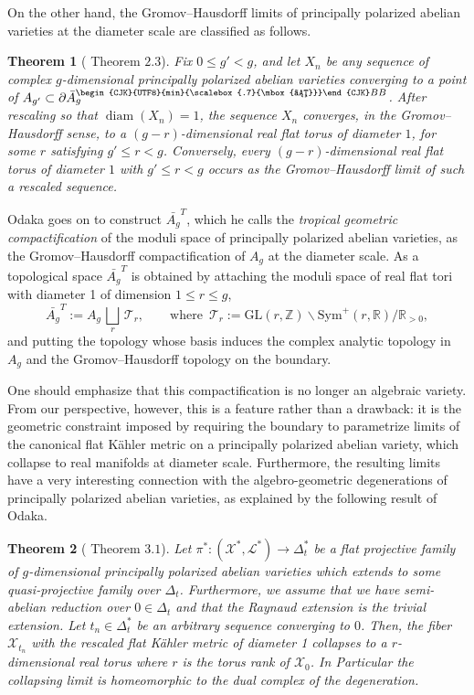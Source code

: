 \documentclass[11pt]{amsart}
\theoremstyle{plain}
\newtheorem{theorem}{Theorem}[section]
\theoremstyle{definition}
\theoremstyle{remark}
\newcommand{\X}{{\mathcal X }}
\newcommand{\R}{\mathbb R}
\newcommand{\Z}{\mathbb{Z}}
\newcommand{\sym}{\mathrm{Sym}^{\!+}}
\newcommand{\sbb}{\text{\begin{CJK}{UTF8}{min}{\scalebox{.7}{\mbox{さ}}}\end{CJK}}BB}
\begin{document}
On the other hand, the Gromov--Hausdorff limits of principally polarized abelian varieties at the diameter scale are classified as follows.
\begin{theorem}[\cite{Odaka2019} Theorem $2.3$]\label{AV.lim.max}
Fix $0\le g'<g$, and let $X_n$ be any sequence of  complex $g$-dimensional principally polarized abelian varieties converging to a point of $A_{g'}\subset \partial\bar A_g^{\sbb}$. After rescaling so that $\operatorname{diam}(X_n)=1$, the sequence $X_n$ converges, in the Gromov--Hausdorff sense, to a $(g-r)$-dimensional real flat torus of diameter $1$, for some $r$ satisfying $g'\le r<g$. Conversely, every $(g-r)$-dimensional real flat torus of diameter $1$ with $g'\le r<g$ occurs as the Gromov--Hausdorff limit of such a rescaled sequence.
\end{theorem}

Odaka goes on to construct $\bar{A_g}^{T}$, which he calls the \emph{tropical geometric compactification} of the moduli space of principally polarized abelian varieties, as the Gromov--Hausdorff compactification of $A_g$ at the diameter scale. As a topological space $\bar{A_g}^T$ is obtained by attaching the moduli space of real flat tori with diameter 1 of dimension $1\leq r \leq g$, 
\begin{equation}
    \label{eq:trop.comp.abel}
    \bar{A_g}^T:=A_g\,\bigsqcup_r\,\mathscr{T}_{r},\qquad\text{where }\,\mathscr{T}_r:=\mathrm{GL}(r,\Z)\backslash\sym(r,\R)/\R_{>0},
\end{equation}
and putting the topology whose basis induces the complex analytic topology in $A_g$ and the Gromov--Hausdorff topology on the boundary. 

One should emphasize that this compactification is no longer an algebraic variety. From our perspective, however, this is a feature rather than a drawback: it is the geometric constraint imposed by requiring the boundary to parametrize limits of the canonical flat K\"ahler metric on a principally polarized abelian variety, which collapse to real manifolds at diameter scale. Furthermore, the resulting limits have a very interesting connection with the algebro-geometric degenerations of principally polarized abelian varieties, as explained by the following result of Odaka.

\begin{theorem}[\cite{Odaka2019} Theorem $3.1$]\label{thm:Oda.holo.family}
Let $\pi^*: (\X^*,\mathcal{L}^*)\to \Delta^*_t$ be a flat projective family of $g$-dimensional principally polarized abelian varieties which extends to some quasi-projective family over $\Delta_t$. Furthermore, we assume that we have semi-abelian reduction over $0\in \Delta_t$ and that the Raynaud extension is the trivial extension. Let $t_n \in \Delta^*_t$ be an arbitrary sequence converging to $0$. Then, the fiber $\X_{t_n}$ with the rescaled flat K\"ahler metric of diameter 1 collapses to a $r$-dimensional real torus where $r$ is the torus rank of $\X_0$. In Particular the collapsing limit is homeomorphic to the dual complex of the degeneration.
\end{theorem}
\end{document}
